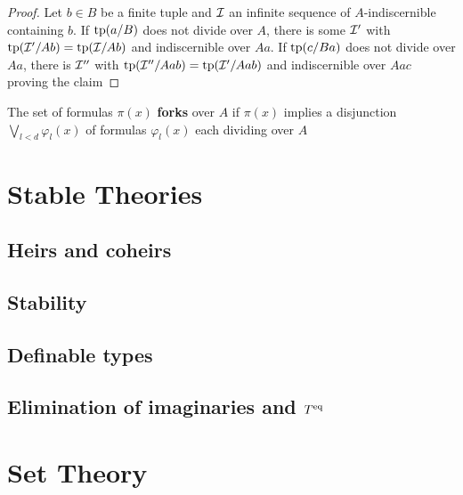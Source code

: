 \documentclass[11pt]{article}
\begin{document}
\begin{proof}
Let \(b\in B\) be a finite tuple and \(\mathcal{I}\) an infinite sequence of \(A\)-indiscernible
containing \(b\). If \(\operatorname{tp}(a/B)\) does not divide over \(A\), there is some \(\mathcal{I}'\)
with \(\operatorname{tp}(\mathcal{I}'/Ab)=\operatorname{tp}(\mathcal{I}/Ab)\) and indiscernible over \(Aa\). If \(\operatorname{tp}(c/Ba)\) does not divide
over \(Aa\), there is \(\mathcal{I}''\) with \(\operatorname{tp}(\mathcal{I}''/Aab)=\operatorname{tp}(\mathcal{I}'/Aab)\) and indiscernible over \(Aac\)
proving the claim
\end{proof}

\begin{theorem}[]
The set of formulas \(\pi(x)\) \textbf{forks} over \(A\) if \(\pi(x)\) implies a
disjunction \(\bigvee_{l<d}\varphi_l(x)\) of formulas \(\varphi_l(x)\) each dividing over \(A\)
\end{theorem}



\section{Stable Theories}
\label{sec:org396dc1b}
\subsection{Heirs and coheirs}
\label{sec:orgac2668a}
\subsection{Stability}
\label{sec:org853d75a}
\subsection{Definable types}
\label{sec:orgad32991}
\subsection{Elimination of imaginaries and \texorpdfstring{\(T^{\operatorname{eq}}\)}{Teq}}
\label{sec:orgb86b2d3}





\appendix
\section{Set Theory}
\label{sec:org7b986d9}
\end{document}
